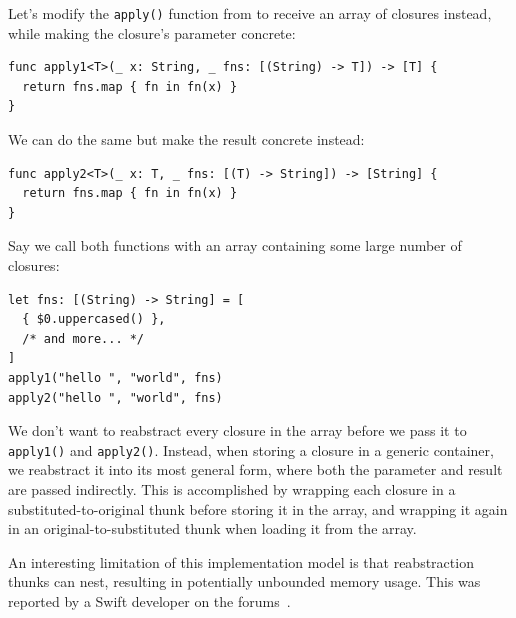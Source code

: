 \documentclass[../generics]{subfiles}
\begin{document}
\begin{example}
Let's modify the \texttt{apply()} function from  to receive an array of closures instead, while making the closure's parameter concrete:
\begin{Verbatim}
func apply1<T>(_ x: String, _ fns: [(String) -> T]) -> [T] {
  return fns.map { fn in fn(x) }
}
\end{Verbatim}
We can do the same but make the result concrete instead:
\begin{Verbatim}
func apply2<T>(_ x: T, _ fns: [(T) -> String]) -> [String] {
  return fns.map { fn in fn(x) }
}
\end{Verbatim}
Say we call both functions with an array containing some large number of closures:
\begin{Verbatim}
let fns: [(String) -> String] = [
  { $0.uppercased() },
  /* and more... */
]
apply1("hello ", "world", fns)
apply2("hello ", "world", fns)
\end{Verbatim}
We don't want to reabstract every closure in the array before we pass it to \texttt{apply1()} and \texttt{apply2()}. Instead, when storing a closure in a generic container,  we reabstract it into its most general form, where both the parameter and result are passed indirectly. This is accomplished by wrapping each closure in a substituted-to-original thunk before storing it in the array, and wrapping it again in an original-to-substituted thunk when loading it from the array.
\end{example}

An interesting limitation of this implementation model is that reabstraction thunks can nest, resulting in potentially unbounded memory usage. This was reported by a Swift developer on the forums~\cite{abstractleak}.
\end{document}
